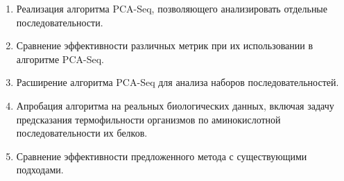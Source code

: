 \begin{enumerate}
  \item Реализация алгоритма PCA-Seq, позволяющего анализировать отдельные последовательности.
  \item Сравнение эффективности различных метрик при их использовании в алгоритме PCA-Seq.
  \item Расширение алгоритма PCA-Seq для анализа наборов последовательностей.
  \item Апробация алгоритма на реальных биологических данных, включая задачу предсказания термофильности организмов по аминокислотной последовательности их белков.
  \item Сравнение эффективности предложенного метода с существующими подходами.
\end{enumerate}
